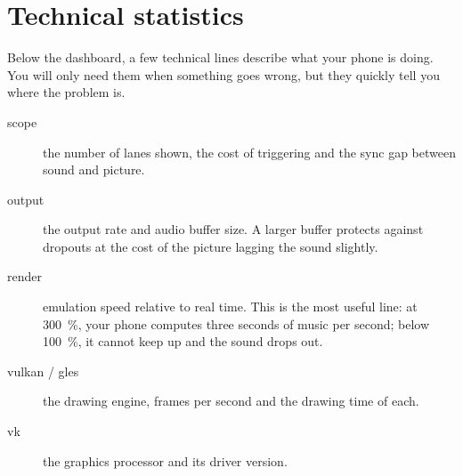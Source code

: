 \chapter{Technical statistics}
Below the dashboard, a few technical lines describe what your phone is doing. You will only need them when something
goes wrong, but they quickly tell you where the problem is.
\begin{description}
  \item[scope] the number of lanes shown, the cost of triggering and the sync gap between sound and picture.
  \item[output] the output rate and audio buffer size. A larger buffer protects against dropouts at the cost of the
        picture lagging the sound slightly.
  \item[render] emulation speed relative to real time. This is the most useful line: at 300~\%, your phone computes
        three seconds of music per second; below 100~\%, it cannot keep up and the sound drops out.
  \item[vulkan / gles] the drawing engine, frames per second and the drawing time of each.
  \item[vk] the graphics processor and its driver version.
\end{description}
